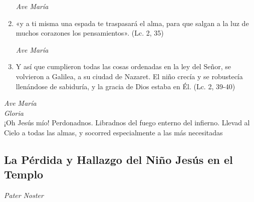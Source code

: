 \documentclass[a4paper,11pt, oneside]{report}
\begin{document}
\begin{enumerate}
        \textit{Ave María}

        \item «y a ti misma una espada te traspasará el alma, para que salgan a la luz de muchos corazones los pensamientos». (Lc. 2, 35)
        
        \textit{Ave María}

        \item Y así que cumplieron todas las cosas ordenadas en la ley del Señor, se volvieron a Galilea, a su ciudad de Nazaret. El niño crecía
        y se robustecía llenándose de sabiduría, y la gracia de Dios estaba en Él. (Lc. 2, 39-40)

      \end{enumerate}

      \textit{Ave María} \\
      \indent\textit{Gloria} \\
      \indent¡Oh Jesús mío! Perdonadnos. Libradnos del fuego enterno del infierno. Llevad al Cielo a todas las almas, y socorred especialmente a las más 
      necesitadas
            
    \subsection*{ La Pérdida y Hallazgo del Niño Jesús en el Templo }
      
      \textit{Pater Noster}
\end{document}
